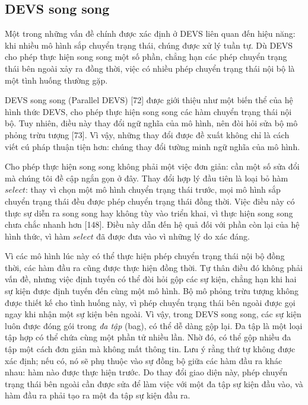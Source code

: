 \subsection{DEVS song song}
Một trong những vấn đề chính được xác định ở DEVS liên quan đến hiệu năng: khi nhiều mô hình sắp chuyển trạng thái, chúng được xử lý tuần tự. Dù DEVS cho phép thực hiện song song một số phần, chẳng hạn các phép chuyển trạng thái bên ngoài xảy ra đồng thời, việc có nhiều phép chuyển trạng thái nội bộ là một tình huống thường gặp.

DEVS song song (Parallel DEVS) [72] được giới thiệu như một biến thể của hệ hình thức DEVS, cho phép thực hiện song song các hàm chuyển trạng thái nội bộ. Tuy nhiên, điều này thay đổi ngữ nghĩa của mô hình, nên đòi hỏi sửa bộ mô phỏng trừu tượng [73]. Vì vậy, những thay đổi được đề xuất không chỉ là cách viết cú pháp thuận tiện hơn: chúng thay đổi tường minh ngữ nghĩa của mô hình.

Cho phép thực hiện song song không phải một việc đơn giản: cần một số sửa đổi mà chúng tôi đề cập ngắn gọn ở đây. Thay đổi hợp lý đầu tiên là loại bỏ hàm $select$: thay vì chọn một mô hình chuyển trạng thái trước, mọi mô hình sắp chuyển trạng thái đều được phép chuyển trạng thái đồng thời. Việc điều này có thực sự diễn ra song song hay không tùy vào triển khai, vì thực hiện song song chưa chắc nhanh hơn [148]. Điều này dẫn đến hệ quả đối với phần còn lại của hệ hình thức, vì hàm $select$ đã được đưa vào vì những lý do xác đáng.

Vì các mô hình lúc này có thể thực hiện phép chuyển trạng thái nội bộ đồng thời, các hàm đầu ra cũng được thực hiện đồng thời. Tự thân điều đó không phải vấn đề, nhưng việc định tuyến có thể đòi hỏi gộp các sự kiện, chẳng hạn khi hai sự kiện được định tuyến đến cùng một mô hình. Bộ mô phỏng trừu tượng không được thiết kế cho tình huống này, vì phép chuyển trạng thái bên ngoài được gọi ngay khi nhận một sự kiện bên ngoài. Vì vậy, trong DEVS song song, các sự kiện luôn được đóng gói trong \emph{đa tập} (bag), có thể dễ dàng gộp lại. Đa tập là một loại tập hợp có thể chứa cùng một phần tử nhiều lần. Nhờ đó, có thể gộp nhiều đa tập một cách đơn giản mà không mất thông tin. Lưu ý rằng thứ tự không được xác định; nếu có, nó sẽ phụ thuộc vào sự đồng bộ giữa các hàm đầu ra khác nhau: hàm nào được thực hiện trước. Do thay đổi giao diện này, phép chuyển trạng thái bên ngoài cần được sửa để làm việc với một đa tập sự kiện đầu vào, và hàm đầu ra phải tạo ra một đa tập sự kiện đầu ra.

